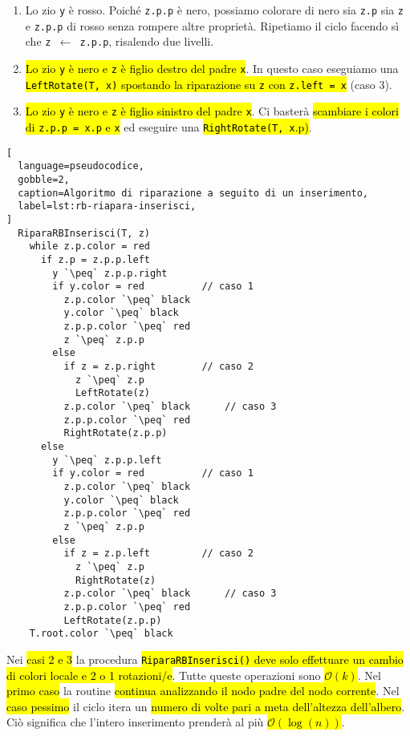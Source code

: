 \documentclass[a4paper,11pt,twoside]{article}
\theoremstyle{plain}
\theoremstyle{definition}
\theoremstyle{remark}
\newcommand{\peq}{$\gets$}
\begin{document}
\begin{enumerate}
  \item Lo zio \texttt{y} è rosso. Poiché \texttt{z.p.p} è nero, possiamo
    colorare di nero sia \texttt{z.p} sia \texttt{z} e \texttt{z.p.p} di rosso
    senza rompere altre proprietà. Ripetiamo il ciclo facendo sì che \texttt{z
    \peq{} z.p.p}, risalendo due livelli.
  \item \hl{Lo zio \texttt{y} è nero e \texttt{z} è figlio destro del padre
    \texttt{x}}. In questo caso eseguiamo una \hl{\texttt{LeftRotate(T, x)}
    spostando la riparazione su \texttt{z} con \texttt{z.left = x}} (caso 3).
  \item \hl{Lo zio \texttt{y} è nero e \texttt{z} è figlio sinistro del padre
    \texttt{x}}. Ci basterà \hl{scambiare i colori di \texttt{z.p.p = x.p} e
    \texttt{x}} ed eseguire una \hl{\texttt{RightRotate(T, x}.p)}.
\end{enumerate}

\begin{lstlisting}[
  language=pseudocodice,
  gobble=2,
  caption=Algoritmo di riparazione a seguito di un inserimento,
  label=lst:rb-riapara-inserisci,
]
  RiparaRBInserisci(T, z)
    while z.p.color = red
      if z.p = z.p.p.left
        y `\peq` z.p.p.right
        if y.color = red          // caso 1
          z.p.color `\peq` black
          y.color `\peq` black
          z.p.p.color `\peq` red
          z `\peq` z.p.p
        else
          if z = z.p.right        // caso 2
            z `\peq` z.p
            LeftRotate(z)
          z.p.color `\peq` black      // caso 3
          z.p.p.color `\peq` red
          RightRotate(z.p.p)
      else
        y `\peq` z.p.p.left
        if y.color = red          // caso 1
          z.p.color `\peq` black
          y.color `\peq` black
          z.p.p.color `\peq` red
          z `\peq` z.p.p
        else
          if z = z.p.left         // caso 2
            z `\peq` z.p
            RightRotate(z)
          z.p.color `\peq` black      // caso 3
          z.p.p.color `\peq` red
          LeftRotate(z.p.p)
    T.root.color `\peq` black
\end{lstlisting}

Nei \hl{casi 2 e 3} la procedura \hl{\texttt{RiparaRBInserisci()} deve solo
effettuare un cambio di colori locale e 2 o 1 rotazioni/e}. Tutte queste
operazioni sono \hl{$\mathcal{O}(k)$}. Nel \hl{primo caso} la routine
\hl{continua analizzando il nodo padre del nodo corrente}. Nel \hl{caso pessimo}
il ciclo itera un \hl{numero di volte pari a meta dell'altezza dell'albero}. Ciò
significa che l'intero inserimento prenderà al più \hl{$\mathcal{O}(\log(n))$}.
\end{document}
